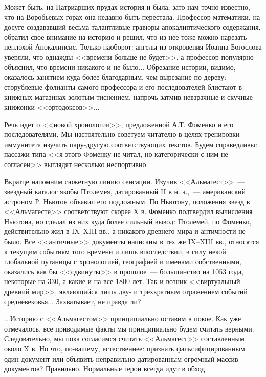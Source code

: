 \documentclass{scrbook}
\newcommand{\flqq}{<<}
\newcommand{\frqq}{>>}
\newcommand{\mdash}{~--- }
\newcommand{\ndash}{--}
\newcommand{\commamdash}{~--- } %
\begin{document}
Может быть, на Патриарших прудах история и была, зато нам точно известно, что на Воробьевых горах она недавно быть перестала. Профессор математики, на досуге создававший весьма талантливые гравюры апокалиптического содержания, обратил свое внимание на историю и решил, что из нее тоже можно нарезать неплохой Апокалипсис. Только наоборот: ангелы из откровения Иоанна Богослова уверяли, что однажды {\flqq}времени больше не будет{\frqq}, а профессор популярно объяснил, что времени никакого и не было... Обрезание истории, видимо, оказалось занятием куда более благодарным, чем вырезание по дереву: сторублевые фолианты самого профессора и его последователей блистают в книжных магазинах золотым тиснением, напрочь затмив невзрачные и скучные книжонки {\flqq}ортодоксов{\frqq}...

Речь идет о {\flqq}новой хронологии{\frqq}, предложенной А.Т. Фоменко и его последователями. Мы настоятельно советуем читателю в целях тренировки иммунитета изучить пару-другую соответствующих текстов. Будем справедливы: пассажи типа {\flqq}я этого Фоменку не читал, но категорически с ним не согласен{\frqq} выглядят несколько неспортивно.

Вкратце напомним сюжетную линию сенсации. Изучив {\flqq}Альмагест{\frqq}{\mdash}звездный каталог якобы Птолемея, датированный II в н. э.,{\commamdash}американский астроном Р. Ньютон объявил его подложным. По Ньютону, положения звезд в {\flqq}Альмагесте{\frqq} соответствуют скорее X в. Фоменко подтвердил вычисления Ньютона, но сделал из них куда более сильный вывод: Птолемей, по Фоменко, действительно жил в IX{\ndash}XIII вв., а никакого древнего мира и античности не было. Все {\flqq}античные{\frqq} документы написаны в тех же IX{\ndash}XIII вв., относятся к текущим событиям того времени и лишь впоследствии, в силу некой глобальной путаницы с хронологией, географией и именами собственными, оказались как бы {\flqq}сдвинуты{\frqq} в прошлое{\mdash}большинство на 1053 года, некоторые на 330, а какие и на все 1800 лет. Так и возник {\flqq}виртуальный древний мир{\frqq}, являющийся лишь дву- и трехкратным отражением событий средневековья... Захватывает, не правда ли?

...Историю с {\flqq}Альмагестом{\frqq} принципиально оставим в покое. Как уже отмечалось, все приводимые факты мы принципиально будем считать верными. Следовательно, мы пока согласимся считать {\flqq}Альмагест{\frqq} составленным около X в. Но что, по-вашему, естественнее: признать фальсифицированным один документ или объявить неправильно датированным огромный массив документов? Правильно. Нормальные герои всегда идут в обход.
\end{document}
